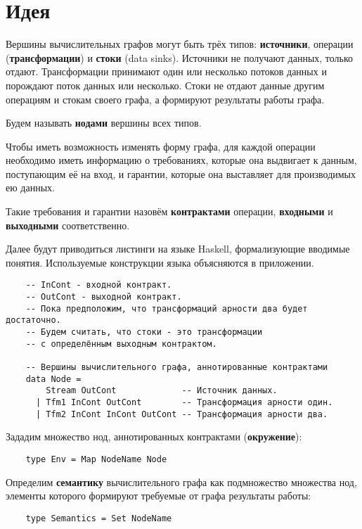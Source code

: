 \section{Идея}

Вершины вычислительных графов могут быть трёх типов: \textbf{источники}, операции (\textbf{трансформации}) и \textbf{стоки} (data sinks). Источники не получают данных, только отдают. Трансформации принимают один или несколько потоков данных и порождают поток данных или несколько. Стоки не отдают данные другим операциям и стокам своего графа, а формируют результаты работы графа.

Будем называть \textbf{нодами} вершины всех типов.

Чтобы иметь возможность изменять форму графа, для каждой операции необходимо иметь информацию о требованиях, которые она выдвигает к данным, поступающим её на вход, и гарантии, которые она выставляет для производимых ею данных.

Такие требования и гарантии назовём \textbf{контрактами} операции, \textbf{входными} и \textbf{выходными} соответственно.

Далее будут приводиться листинги на языке Haskell, формализующие вводимые понятия.
Используемые конструкции языка объясняются в приложении. %

\begin{lstlisting}
    -- InCont - входной контракт.
    -- OutCont - выходной контракт.
    -- Пока предположим, что трансформаций арности два будет достаточно.
    -- Будем считать, что стоки - это трансформации
    -- с определённым выходным контрактом.

    -- Вершины вычислительного графа, аннотированные контрактами
    data Node =
        Stream OutCont             -- Источник данных.
      | Tfm1 InCont OutCont        -- Трансформация арности один.
      | Tfm2 InCont InCont OutCont -- Трансформация арности два.
\end{lstlisting}

Зададим множество нод, аннотированных контрактами (\textbf{окружение}):
\begin{lstlisting}
    type Env = Map NodeName Node
\end{lstlisting}

Определим \textbf{семантику} вычислительного графа как подмножество множества нод, элементы которого формируют требуемые от графа результаты работы:
\begin{lstlisting}
    type Semantics = Set NodeName
\end{lstlisting}

